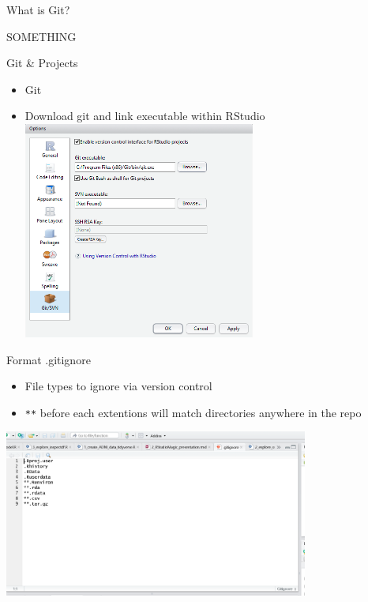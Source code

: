 \documentclass[
  ignorenonframetext,
]{beamer}
\providecommand{\tightlist}{%
  \setlength{\itemsep}{0pt}\setlength{\parskip}{0pt}}
\begin{document}
\begin{frame}{What is Git?}
\protect\hypertarget{what-is-git}{}

SOMETHING

\end{frame}

\begin{frame}{Git \& Projects}
\protect\hypertarget{git-projects}{}

\begin{itemize}[<+->]
\tightlist
\item
  Git
\item
  Download git and link executable within RStudio
  \includegraphics[width=0.6\textwidth,height=\textheight]{../external/images/setup_1_rstudio_git.PNG}
\end{itemize}

\end{frame}

\begin{frame}[fragile]{Format .gitignore}
\protect\hypertarget{format-.gitignore}{}

\begin{itemize}[<+->]
\tightlist
\item
  File types to ignore via version control
\item
  \texttt{**} before each extentions will match directories anywhere in
  the repo
\end{itemize}

\includegraphics[width=0.75\textwidth,height=\textheight]{../external/images/gitignore.PNG}

\end{frame}
\end{document}
